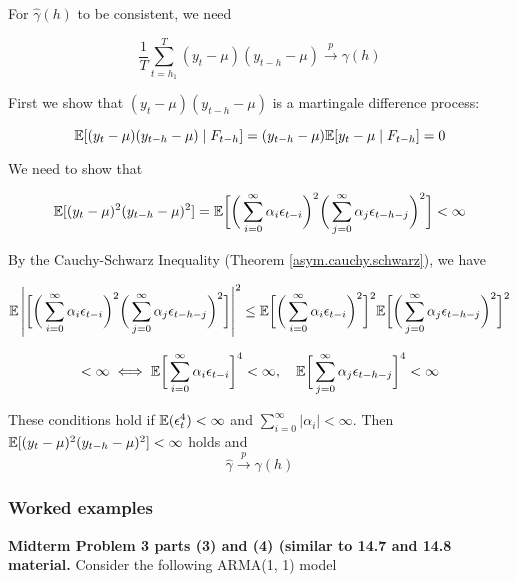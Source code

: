 %
%

For \(\hat{\gamma}(h)\) to be consistent, we need

\[
\frac{1}{T}\sum_{t=h_1}^T (y_t - \mu)(y_{t-h} - \mu) \xrightarrow{p} \gamma(h) 
\]

First we show that \((y_t - \mu)(y_{t-h} - \mu)\) is a martingale difference process:

\[
\E[(y_t - \mu)(y_{t-h} - \mu) \mid F_{t-h}] =(y_{t-h} - \mu)  \E[y_t - \mu \mid F_{t-h}] = 0
\]


We need to show that

\[
\E[(y_t - \mu)^2(y_{t-h} - \mu)^2 ] = \E \bigg[ \bigg( \sum_{i=0}^\infty \alpha_i \epsilon_{t-i} \bigg)^2 \bigg( \sum_{j=0}^\infty \alpha_j \epsilon_{t - h - j} \bigg) ^2 \bigg] < \infty
\]

By the Cauchy-Schwarz Inequality (Theorem \ref{asym.cauchy.schwarz}), we have

\[
\E \left| \bigg[ \bigg( \sum_{i=0}^\infty \alpha_i \epsilon_{t-i} \bigg)^2 \bigg( \sum_{j=0}^\infty \alpha_j \epsilon_{t - h - j} \bigg) ^2 \bigg] \right| ^2 \leq \E \bigg[ \bigg( \sum_{i=0}^\infty \alpha_i \epsilon_{t-i} \bigg)^2\bigg]^2 \E \bigg[ \bigg( \sum_{j=0}^\infty \alpha_j \epsilon_{t - h - j} \bigg) ^2\bigg]^2
\]

\[
< \infty \iff \E \bigg[ \sum_{i=0}^\infty \alpha_i \epsilon_{t-i}\bigg]^4 < \infty, \ \ \  \E \bigg[ \sum_{j=0}^\infty \alpha_j \epsilon_{t - h - j} \bigg]^4 < \infty
\]

These conditions hold if \(\E(\epsilon_t^4) < \infty\) and \(\sum_{i=0}^\infty |\alpha_i| < \infty\). Then \(\E[(y_t - \mu)^2(y_{t-h} - \mu)^2 ] < \infty\) holds and
\[
\hat{\gamma} \xrightarrow{p} \gamma(h)
\]



\subsubsection{Worked examples}

\textbf{Midterm Problem 3 parts (3) and (4) (similar to 14.7 and 14.8 material.} Consider the following ARMA(1, 1) model

